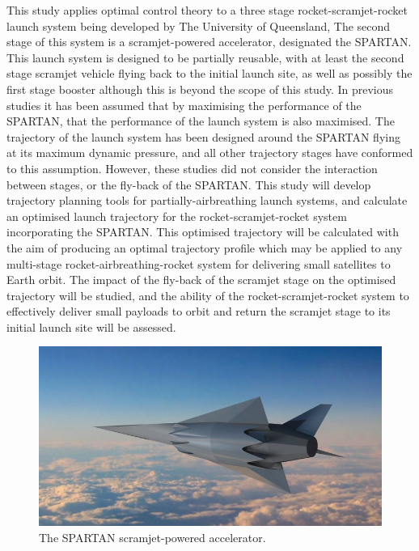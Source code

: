   
  
  	   This study applies optimal control theory to a three stage rocket-scramjet-rocket launch system being developed by The University of Queensland, The second stage of this system is a scramjet-powered accelerator, designated the SPARTAN\cite{Preller2017b}. This launch system is designed to be partially reusable, with at least the second stage scramjet vehicle flying back to the initial launch site, as well as possibly the first stage booster\cite{Preller2017b} although this is beyond the scope of this study. 
  	   In previous studies it has been assumed that by maximising the performance of the SPARTAN, that the performance of the launch system is also maximised\cite{Preller2017b}. 
  	   The trajectory of the launch system has been designed around the SPARTAN flying at its
  	   maximum dynamic pressure, and all other trajectory stages have conformed to this assumption. However, these studies did not consider the interaction between stages, or the fly-back of the SPARTAN.
  	   This study will develop trajectory planning tools for partially-airbreathing launch systems, and calculate an optimised launch trajectory for the rocket-scramjet-rocket system incorporating the SPARTAN. This optimised trajectory will be calculated with the aim of producing an optimal
  	   trajectory profile which may be applied to any multi-stage rocket-airbreathing-rocket system for delivering small
  	   satellites to Earth orbit. The impact of the fly-back of the scramjet stage on the optimised trajectory will be studied, and the ability of the rocket-scramjet-rocket system to effectively deliver small payloads to orbit and return the scramjet stage to its initial launch site will be assessed. 
  	   
  	  	\begin{figure}[ht]
  	  		\centering
  	  		\includegraphics[width=0.7\linewidth]{figures/1_introduction/project-spartan}
  	  		\caption{The SPARTAN scramjet-powered accelerator\cite{BBC}.}
  	  		\label{fig:project-spartan}
  	  	\end{figure}
  	  	
